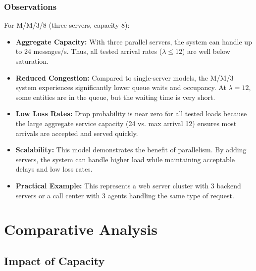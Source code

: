 \documentclass[12pt]{article}
\begin{document}
\subsubsection{Observations}

For M/M/3/8 (three servers, capacity 8):

\begin{itemize}
    \item \textbf{Aggregate Capacity:} With three parallel servers, the system can handle up to 24 messages/s. Thus, all tested arrival rates ($\lambda \le 12$) are well below saturation.

    \item \textbf{Reduced Congestion:} Compared to single-server models, the M/M/3 system experiences significantly lower queue waits and occupancy. At $\lambda = 12$, some entities are in the queue, but the waiting time is very short.

    \item \textbf{Low Loss Rates:} Drop probability is near zero for all tested loads because the large aggregate service capacity (24 vs. max arrival 12) ensures most arrivals are accepted and served quickly.

    \item \textbf{Scalability:} This model demonstrates the benefit of parallelism. By adding servers, the system can handle higher load while maintaining acceptable delays and low loss rates.

    \item \textbf{Practical Example:} This represents a web server cluster with 3 backend servers or a call center with 3 agents handling the same type of request.
\end{itemize}

\section{Comparative Analysis}

\subsection{Impact of Capacity}
\end{document}
